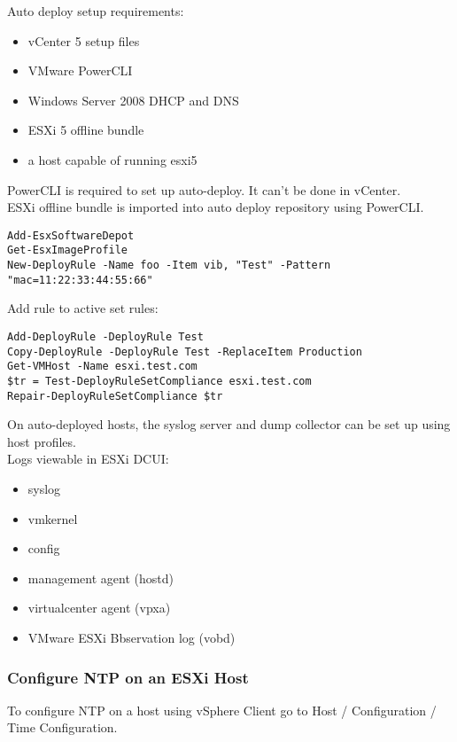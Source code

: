 Auto deploy setup requirements:

\begin{itemize}
\item vCenter 5 setup files
\item VMware PowerCLI
\item Windows Server 2008 DHCP and DNS
\item ESXi 5 offline bundle
\item a host capable of running esxi5
\end{itemize}

PowerCLI is required to set up auto-deploy. It can't be done in vCenter.\\

ESXi offline bundle is imported into auto deploy repository using PowerCLI.

\begin{verbatim}
Add-EsxSoftwareDepot
Get-EsxImageProfile
New-DeployRule -Name foo -Item vib, "Test" -Pattern "mac=11:22:33:44:55:66"  
\end{verbatim}

Add rule to active set rules:

\begin{verbatim}
Add-DeployRule -DeployRule Test
Copy-DeployRule -DeployRule Test -ReplaceItem Production
Get-VMHost -Name esxi.test.com
$tr = Test-DeployRuleSetCompliance esxi.test.com
Repair-DeployRuleSetCompliance $tr
\end{verbatim}

On auto-deployed hosts, the syslog server and dump collector can be set up
using host profiles.\\

Logs viewable in ESXi DCUI:

\begin{itemize}
\item syslog
\item vmkernel
\item config
\item management agent (hostd)
\item virtualcenter agent (vpxa)
\item VMware ESXi Bbservation log (vobd)
\end{itemize}

\subsubsection{Configure NTP on an ESXi Host}

To configure NTP on a host using vSphere Client go to Host / Configuration /
Time Configuration.

